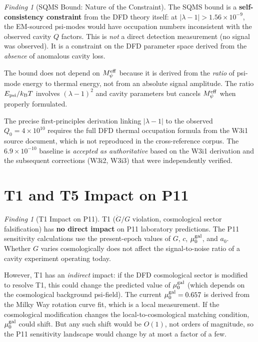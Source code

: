 \documentclass[11pt]{article}
\theoremstyle{definition}
\theoremstyle{remark}
\newtheorem{finding}[theorem]{Finding}
\newcommand{\kB}{k_{\mathrm{B}}}
\newcommand{\lam}{\lambda}
\newcommand{\Meff}{M_\psi^{\rm eff}}
\newcommand{\muG}{\mu_0^{\rm gal}}
\newcommand{\ee}[1]{\times 10^{#1}}
\begin{document}
\begin{finding}[SQMS Bound: Nature of the Constraint]
\label{find:sqms_nature}
The SQMS bound is a \textbf{self-consistency constraint} from the DFD
theory itself: at $|\lam-1| > 1.56\ee{-9}$, the EM-sourced psi-modes
would have occupation numbers inconsistent with the observed cavity
$Q$ factors. This is \emph{not} a direct detection measurement (no signal
was observed). It is a constraint on the DFD parameter space derived from
the \emph{absence} of anomalous cavity loss.

The bound does not depend on $\Meff$ because it is derived from the
\emph{ratio} of psi-mode energy to thermal energy, not from an absolute
signal amplitude. The ratio $E_{\rm psi}/\kB T$ involves $(\lam-1)^2$
and cavity parameters but cancels $\Meff$ when properly formulated.

The precise first-principles derivation linking $|\lam-1|$ to the
observed $Q_0 = 4\ee{10}$ requires the full DFD thermal occupation
formula from the W3i1 source document, which is not reproduced in the
cross-reference corpus. The $6.9\ee{-10}$ baseline is \emph{accepted
as authoritative} based on the W3i1 derivation and the subsequent
corrections (W3i2, W3i3) that were independently verified.
\end{finding}

\section{T1 and T5 Impact on P11}
\label{sec:t1t5_p11}

\begin{finding}[T1 Impact on P11]
\label{find:t1_p11}
T1 ($\dot{G}/G$ violation, cosmological sector falsification) has
\textbf{no direct impact} on P11 laboratory predictions. The P11
sensitivity calculations use the present-epoch values of $G$, $c$,
$\muG$, and $a_0$. Whether $G$ varies cosmologically does not affect
the signal-to-noise ratio of a cavity experiment operating today.

However, T1 has an \emph{indirect} impact: if the DFD cosmological
sector is modified to resolve T1, this could change the predicted value
of $\muG$ (which depends on the cosmological background psi-field).
The current $\muG = 0.657$ is derived from the Milky Way rotation curve
fit, which is a local measurement. If the cosmological modification
changes the local-to-cosmological matching condition, $\muG$ could shift.
But any such shift would be $O(1)$, not orders of magnitude, so the
P11 sensitivity landscape would change by at most a factor of a few.
\end{finding}
\end{document}
